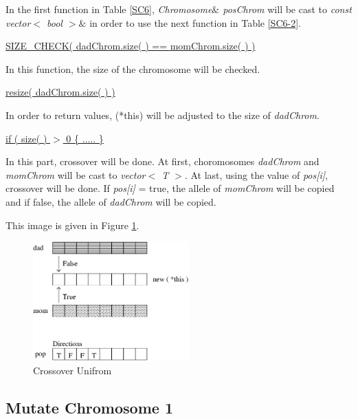 \documentclass[twocolumn]{article}
\begin{document}
\noindent
In the first function in Table \ref{SC6}, {\em Chromosome$\&$ posChrom} will
be cast to {\em const vector$<$ bool $>$$\&$} in order to use the next
function in Table \ref{SC6-2}.

\vspace*{2mm}

\noindent
\underline{SIZE\_CHECK( dadChrom.size( ) == }
\underline{momChrom.size( ) )}

\noindent
In this function, the size of the chromosome will be checked.

\vspace*{2mm}

\noindent
\underline{resize( dadChrom.size( ) )}

\noindent
In order to return values, (*this) will be adjusted to the size of {\em
dadChrom}.

\vspace*{2mm}

\noindent
\underline{if ( size( ) $>$ 0 \{ ..... \}}

\noindent
In this part, crossover will be done. At first, choromosomes {\em
dadChrom} and {\em momChrom} will be cast to {\em vector$<$ T $>$}. At
last, using the value of {\em pos[i]}, crossover will be done. If {\em
pos[i]} = true, the allele of {\em momChrom} will be copied and if false,
the allele of {\em dadChrom} will be copied.

\noindent
This image is given in Figure \ref{Crossover}.

\begin{figure}[h]
\begin{center}
\includegraphics[width=6cm]{crossoveruniform.eps} 
\caption{Crossover Unifrom}
\label{Crossover}
\end{center}
\end{figure}

\subsection{Mutate Chromosome 1}
\end{document}
